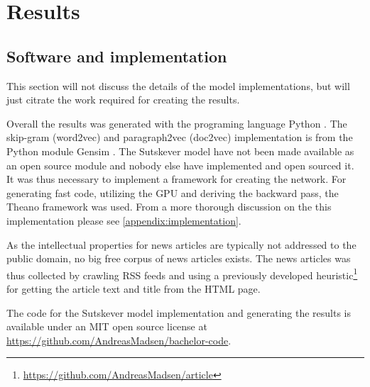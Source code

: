 \chapter{Results}

\section{Software and implementation}
This section will not discuss the details of the model implementations, but will just citrate the work required for creating the results.

Overall the results was generated with the programing language Python \cite{python}. The skip-gram (word2vec) and paragraph2vec (doc2vec) implementation is from the Python module Gensim \cite{gensim}. The Sutskever model \cite{sutskever} have not been made available as an open source module and nobody else have implemented and open sourced it. It was thus necessary to implement a framework for creating the network. For generating fast code, utilizing the GPU and deriving the backward pass, the Theano framework \cite{theano-a, theano-b} was used. From a more thorough discussion on the this implementation please see \autoref{appendix:implementation}.

As the intellectual properties for news articles are typically not addressed to the public domain, no big free corpus of news articles exists. The news articles was thus collected by crawling RSS feeds and using a previously developed heuristic\footnote{\url{https://github.com/AndreasMadsen/article}} for getting the article text and title from the HTML page.

The code for the Sutskever model implementation and generating the results is available under an MIT open source license at \url{https://github.com/AndreasMadsen/bachelor-code}.

\clearpage

\clearpage

\clearpage

